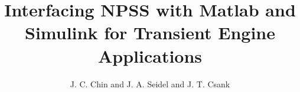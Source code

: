 \documentclass[]             %
{NASA}                       %
\title{Interfacing NPSS with Matlab and Simulink for Transient Engine Applications}
\author{J. C. Chin and J. A. Seidel and J. T. Csank} %
\begin{document}
\tableofcontents
\listoffigures
\listoftables




\cite{Turbofan}
\cite{NonlinearDynamic}
\cite{MatlabOOP}
\cite{Volume Dynamic}
\cite{TTECTrA}
\cite{NPSS}




\end{document}

